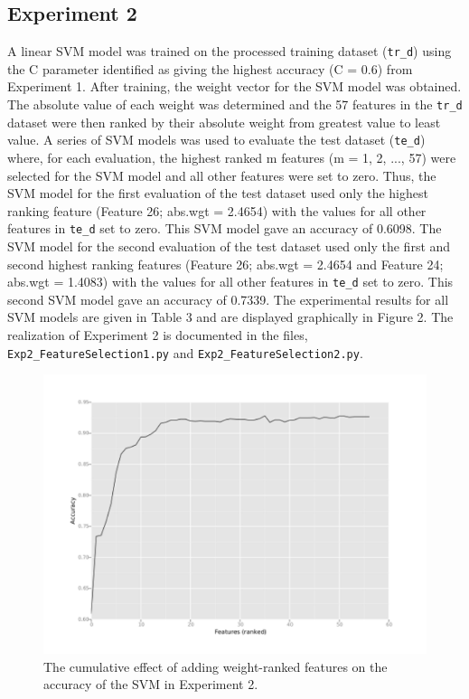 \documentclass[12pt]{article}
\begin{document}
\subsection{Experiment 2}
A linear SVM model was trained on the processed training dataset (\verb|tr_d|) using the C parameter identified as giving the highest accuracy (C = 0.6) from Experiment 1. After training, the weight vector for the SVM model was obtained. The absolute value of each weight was determined and the 57 features in the \verb|tr_d| dataset were then ranked by their absolute weight from greatest value to least value. A series of SVM models was used to evaluate the test dataset (\verb|te_d|) where, for each evaluation, the highest ranked m features (m = 1, 2, ..., 57) were selected for the SVM model and all other features were set to zero. Thus, the SVM model for the first evaluation of the test dataset used only the highest ranking feature (Feature 26; abs.wgt = 2.4654) with the values for all other features in \verb|te_d| set to zero. This SVM model gave an accuracy of 0.6098. The SVM model for the second evaluation of the test dataset used only the first and second highest ranking features (Feature 26; abs.wgt = 2.4654 and Feature 24; abs.wgt = 1.4083) with the values for all other features in \verb|te_d| set to zero. This second SVM model gave an accuracy of 0.7339. The experimental results for all SVM models are given in Table 3 and are displayed graphically in Figure 2.  The realization of Experiment 2 is documented in the files, \verb|Exp2_FeatureSelection1.py| and \verb|Exp2_FeatureSelection2.py|.

\begin{figure}
	\begin{center}
		\includegraphics{exp2_accuracies.pdf}
		\caption{The cumulative effect of adding weight-ranked features on the accuracy of the SVM in Experiment 2.}
	\end{center}
\end{figure}
\end{document}
